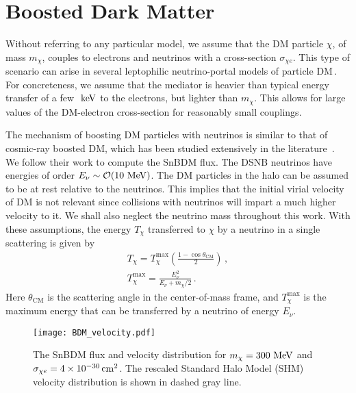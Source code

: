 \documentclass[prd,aps,twocolumn,tightenlines,notitlepage,nofootinbib,preprintnumbers,letterpaper,superscriptaddress]{revtex4-2}
\newcommand{\sbdm}{SnBDM }
\newcommand{\cmsq}{{\rm\,cm^2}}
\newcommand{\keV}{{\rm\ keV}}
\newcommand{\MeV}{{\rm\ MeV}}
\newcommand{\mchi}{m_\chi}
\newcommand{\sce}{\sigma_{\chi e}}
\begin{document}
\section{Boosted Dark Matter}
Without referring to any particular model, we assume that the DM particle $\chi$, of mass $\mchi$, couples to electrons and neutrinos with a cross-section $\sce$. This type of scenario can arise in several leptophilic neutrino-portal models of particle DM\,\cite{Bernabei_2008,falkowski2009dark,Fox_2009,Chang_2014,Lindner_2010,macias2015effective,Blennow_2019,FileviezPerez:2019cyn}.
For concreteness, we assume that the mediator is heavier than typical energy transfer of a few $\keV$ to the electrons, but lighter than $\mchi$. This allows for large values of the DM-electron cross-section for reasonably small couplings. 


The mechanism of boosting DM particles with neutrinos is similar to that of cosmic-ray boosted DM, which has been studied extensively in the literature~\cite{Bringmann:2018cvk,Cappiello:2018hsu}. We follow their work to compute the \sbdm flux.
The DSNB neutrinos have energies of order $E_\nu\sim \mathcal{O}(10\MeV)$. The DM particles in the halo can be assumed to be at rest relative to the neutrinos. This implies that the initial virial velocity of DM is not relevant since collisions with neutrinos will impart a much higher velocity to it. We shall also neglect the neutrino mass throughout this work. With these assumptions, the energy $T_\chi$ transferred to $\chi$ by a neutrino in a single scattering is given by
\begin{align}
	T_\chi = T_\chi^\mathrm{max} \left(\frac{1-\cos\theta_\mathrm{CM}}{2}\right)\,,\\
	T_\chi^\mathrm{max} = \frac{E_\nu^2}{E_\nu+\mchi/2}\,.\nonumber
\end{align}
Here $\theta_\mathrm{CM}$ is the scattering angle in the center-of-mass frame, and $T_\chi^\mathrm{max}$ is the maximum energy that can be transferred by a neutrino of energy $E_\nu$.
\begin{figure}[t]
    \centering
    \texttt{[image: BDM\_velocity.pdf]}
    \caption{The \sbdm flux and velocity distribution for $\mchi=300\MeV$ and $\sce=4\times 10^{-30}\cmsq$. The rescaled Standard Halo Model (SHM) velocity distribution is shown in dashed gray line.}
    \label{fig:bdm_flux}
\end{figure}
\end{document}
